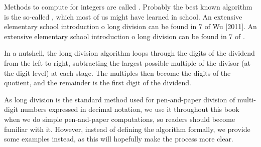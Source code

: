 Methods to compute  for integers are called . Probably the best known algorithm is the so-called , which most of us might have learned in school. An extensive elementary school introduction o long division can be found in \chaptname{} 7 of Wu [2011]. An extensive elementary school introduction o long division can be found in \chaptname{} 7 of \cite{wu-1}.

In a nutshell, the long division algorithm loops through the digits of the dividend from the left to right, subtracting the largest possible multiple of the divisor (at the digit level) at each stage. The multiples then become the digits of the quotient, and the remainder is the first digit of the dividend.

As long division is the standard method used for pen-and-paper division of multi-digit numbers expressed in decimal notation, we use it throughout this book when we do simple pen-and-paper computations, so readers should become familiar with it. However, instead of defining the algorithm formally, we  provide some examples instead, as this will hopefully make the process more clear.

